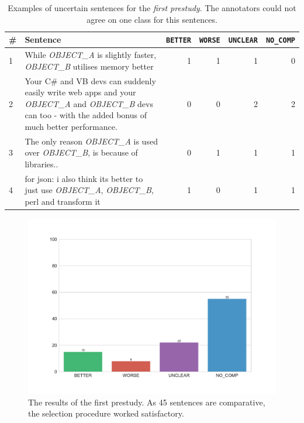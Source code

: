 \begin{table}[htbp]
\centering
\caption{Examples of uncertain sentences for the \emph{first prestudy}. The annotators could not agree on one class for this sentences. }
\label{tbl:pre_1_res}
\begin{tabularx}{\textwidth}{lXrrrr}
\toprule
\# & Sentence        & \texttt{BETTER} & \texttt{WORSE} & \texttt{UNCLEAR} & \texttt{NO\_COMP}          \\ \midrule

1&While \emph{OBJECT\_A} is slightly faster, \emph{OBJECT\_B} utilises memory better & 1 & 1 & 1 & 0 \\

2&Your C\# and VB devs can suddenly easily write web apps and your \emph{OBJECT\_A} and \emph{OBJECT\_B} devs can too - with the added bonus of much better performance. & 0 & 0 & 2 & 2 \\

3&The only reason \emph{OBJECT\_A} is used over \emph{OBJECT\_B}, is because of libraries.. & 0 & 1 & 1 & 1 \\

4&for json: i also think its better to just use \emph{OBJECT\_A}, \emph{OBJECT\_B}, perl and transform it & 1 & 0 & 1 & 1 \\

\bottomrule                              
\end{tabularx}
\end{table}

\begin{figure}[htbp]
\centering
\caption{The results of the first prestudy. As 45  sentences are comparative, the selection procedure worked satisfactory.}
\label{fig:dist_pre_a}
\includegraphics[width=1\linewidth]{images/dataset/prea-dist}
\end{figure}
\FloatBarrier

